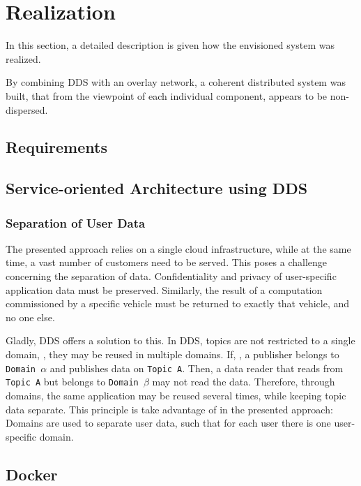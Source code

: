 
\chapter{Realization}\label{chapter:realization}

In this section, a detailed description is given how the envisioned system was realized.

By combining DDS with an overlay network, a coherent distributed system \cite{tanenbaum2017distributed} was built, that from the viewpoint of each individual component, appears to be non-dispersed.


\section{Requirements}




\section{Service-oriented Architecture using DDS}

\subsection{Separation of User Data}

The presented approach relies on a single cloud infrastructure, while at the same time, a vast number of customers need to be served. This poses a challenge concerning the separation of data. Confidentiality and privacy of user-specific application data must be preserved. Similarly, the result of a computation commissioned by a specific vehicle must be returned to exactly that vehicle, and no one else. 

Gladly, DDS offers a solution to this. In DDS, topics are not restricted to a single domain, \ie , they may be reused in multiple domains. If, \eg , a publisher belongs to \texttt{Domain $\alpha$} and publishes data on \texttt{Topic A}. Then, a data reader that reads from \texttt{Topic A} but belongs to \texttt{Domain $\beta$} may not read the data. Therefore, through domains, the same application may be reused several times, while keeping topic data separate. This principle is take advantage of in the presented approach: Domains are used to separate user data, such that for each user there is one user-specific domain.


\section{Docker}

